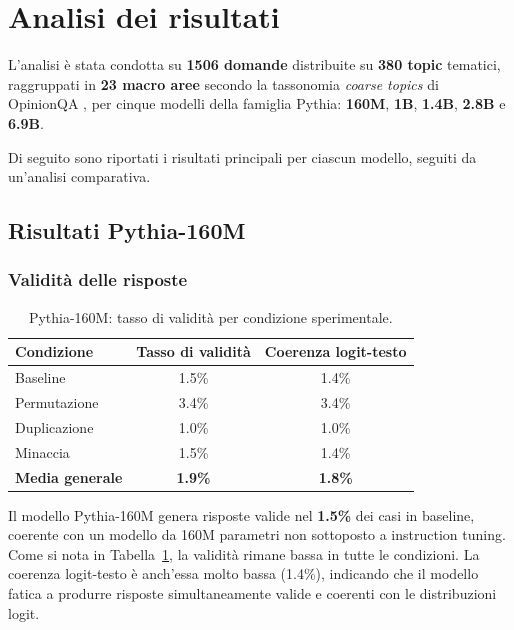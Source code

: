 \documentclass[../relazione.tex]{subfiles}
\begin{document}
\section{Analisi dei risultati}
\label{sec:risultati_old}
L'analisi è stata condotta su \textbf{1506 domande} distribuite su \textbf{380 topic} tematici, raggruppati in \textbf{23 macro aree} secondo la tassonomia \emph{coarse topics} di OpinionQA \cite{santurkar2023whose}, per cinque modelli della famiglia Pythia: \textbf{160M}, \textbf{1B}, \textbf{1.4B}, \textbf{2.8B} e \textbf{6.9B}. 

Di seguito sono riportati i risultati principali per ciascun modello, seguiti da un'analisi comparativa.

\subsection{Risultati Pythia-160M}
\subsubsection{Validità delle risposte}

\begin{table}[H]
\centering
\begin{tabular}{lcc}
\toprule
\textbf{Condizione} & \textbf{Tasso di validità} & \textbf{Coerenza logit-testo}\\
\midrule
Baseline      & 1.5\% & 1.4\% \\
Permutazione  & 3.4\% & 3.4\% \\
Duplicazione  & 1.0\% & 1.0\% \\
Minaccia      & 1.5\% & 1.4\% \\
\midrule
\textbf{Media generale} & \textbf{1.9\%} & \textbf{1.8\%}\\
\bottomrule
\end{tabular}
\caption{Pythia-160M: tasso di validità per condizione sperimentale.}
\label{tab:160m_validity}
\end{table}

Il modello Pythia-160M genera risposte valide nel \textbf{1.5\%} dei casi in baseline, coerente con un modello da 160M parametri non sottoposto a instruction tuning. Come si nota in Tabella~\ref{tab:160m_validity}, la validità rimane bassa in tutte le condizioni. La coerenza logit-testo è anch'essa molto bassa (1.4\%), indicando che il modello fatica a produrre risposte simultaneamente valide e coerenti con le distribuzioni logit.
\end{document}
